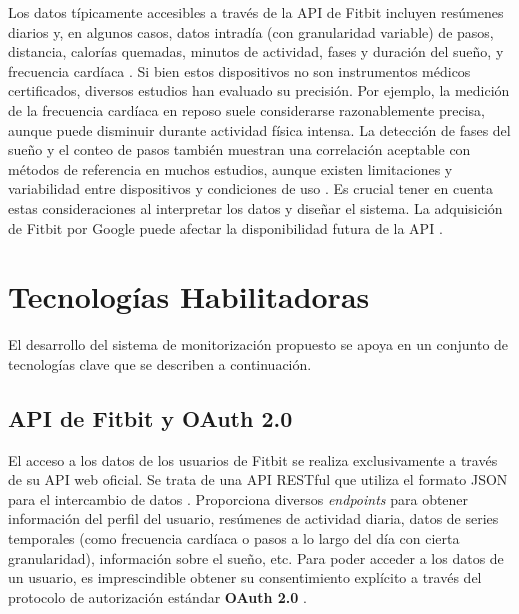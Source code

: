 Los datos típicamente accesibles a través de la API de Fitbit\textsuperscript{\textregistered} incluyen resúmenes diarios y, en algunos casos, datos intradía (con granularidad variable) de pasos, distancia, calorías quemadas, minutos de actividad, fases y duración del sueño, y frecuencia cardíaca \cite{fitbit_api_reference}. Si bien estos dispositivos no son instrumentos médicos certificados, diversos estudios han evaluado su precisión. Por ejemplo, la medición de la frecuencia cardíaca en reposo suele considerarse razonablemente precisa, aunque puede disminuir durante actividad física intensa. La detección de fases del sueño y el conteo de pasos también muestran una correlación aceptable con métodos de referencia en muchos estudios, aunque existen limitaciones y variabilidad entre dispositivos y condiciones de uso \cite{haghayegh2019accuracy, nelson2016validity}. Es crucial tener en cuenta estas consideraciones al interpretar los datos y diseñar el sistema. La adquisición de Fitbit por Google puede afectar la disponibilidad futura de la API \cite{google_fitbit_acquisition_info}.
\section{Tecnologías Habilitadoras}
\label{sec:ea_tecnologias}

El desarrollo del sistema de monitorización propuesto se apoya en un conjunto de tecnologías clave que se describen a continuación.

\subsection{API de Fitbit y OAuth 2.0}
\label{subsec:ea_fitbit_api_oauth}

El acceso a los datos de los usuarios de Fitbit\textsuperscript{\textregistered} se realiza exclusivamente a través de su API web oficial. Se trata de una API RESTful que utiliza el formato JSON para el intercambio de datos \cite{fitbit_api_reference}. Proporciona diversos \textit{endpoints} para obtener información del perfil del usuario, resúmenes de actividad diaria, datos de series temporales (como frecuencia cardíaca o pasos a lo largo del día con cierta granularidad), información sobre el sueño, etc. Para poder acceder a los datos de un usuario, es imprescindible obtener su consentimiento explícito a través del protocolo de autorización estándar \textbf{OAuth 2.0} \cite{oauth_spec_rfc6749}.

